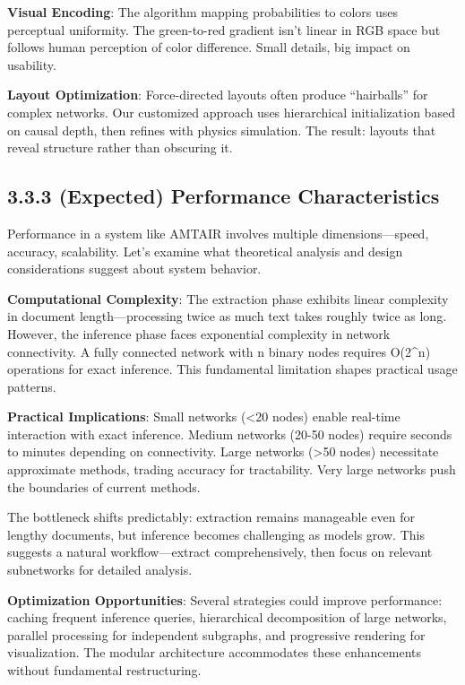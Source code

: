 \documentclass[
  11pt,
  letterpaper,
  openany]{book}
\begin{document}
\textbf{Visual Encoding}: The algorithm mapping probabilities to colors
uses perceptual uniformity. The green-to-red gradient isn't linear in
RGB space but follows human perception of color difference. Small
details, big impact on usability.

\textbf{Layout Optimization}: Force-directed layouts often produce
``hairballs'' for complex networks. Our customized approach uses
hierarchical initialization based on causal depth, then refines with
physics simulation. The result: layouts that reveal structure rather
than obscuring it.

\subsection{3.3.3 (Expected) Performance
Characteristics}\label{sec-performance}

Performance in a system like AMTAIR involves multiple
dimensions---speed, accuracy, scalability. Let's examine what
theoretical analysis and design considerations suggest about system
behavior.

\textbf{Computational Complexity}: The extraction phase exhibits linear
complexity in document length---processing twice as much text takes
roughly twice as long. However, the inference phase faces exponential
complexity in network connectivity. A fully connected network with n
binary nodes requires O(2\^{}n) operations for exact inference. This
fundamental limitation shapes practical usage patterns.

\textbf{Practical Implications}: Small networks (\textless20 nodes)
enable real-time interaction with exact inference. Medium networks
(20-50 nodes) require seconds to minutes depending on connectivity.
Large networks (\textgreater50 nodes) necessitate approximate methods,
trading accuracy for tractability. Very large networks push the
boundaries of current methods.

The bottleneck shifts predictably: extraction remains manageable even
for lengthy documents, but inference becomes challenging as models grow.
This suggests a natural workflow---extract comprehensively, then focus
on relevant subnetworks for detailed analysis.

\textbf{Optimization Opportunities}: Several strategies could improve
performance: caching frequent inference queries, hierarchical
decomposition of large networks, parallel processing for independent
subgraphs, and progressive rendering for visualization. The modular
architecture accommodates these enhancements without fundamental
restructuring.
\end{document}
